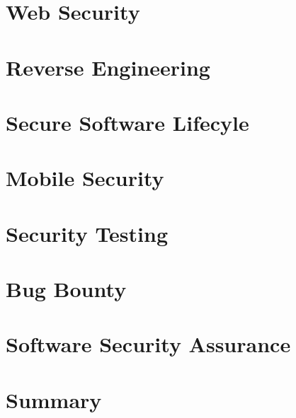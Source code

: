 \documentclass[main.tex,fontsize=8pt,paper=a4,paper=portrait,DIV=calc,]{scrartcl}
\begin{document}
\section{Web Security}

\section{Reverse Engineering}

\section{Secure Software Lifecyle}

\section{Mobile Security}

\section{Security Testing}

\section{Bug Bounty}

\section{Software Security Assurance}

\section{Summary}
\end{document}
